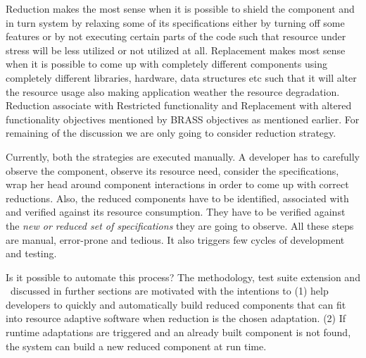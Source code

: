 Reduction makes the most sense when it is possible to shield the component and in turn system by relaxing some of its specifications either by turning off some features or by not executing certain parts of the code such that resource under stress will be less utilized or not utilized at all. Replacement makes most sense when it is possible to come up with completely different components using completely different libraries, hardware, data structures etc such that it will alter the resource usage also making application weather the resource degradation. Reduction associate with Restricted functionality and Replacement with altered functionality objectives mentioned by BRASS objectives as mentioned earlier. For remaining of the discussion we are only going to consider reduction strategy.   

Currently, both the strategies are executed manually. A developer has to carefully observe the component, observe its resource need, consider the specifications, wrap her head around component interactions in order to come up with correct reductions. Also, the reduced components have to be identified, associated with and verified against its resource consumption. They have to be verified against the \emph{new or reduced set of specifications} they are going to observe. All these steps are manual, error-prone and tedious. It also triggers few cycles of development and testing. 

Is it possible to automate this process? The methodology, test suite extension and \mytool\ discussed in further sections are motivated with the intentions to (1) help developers to quickly and automatically build reduced components that can fit into resource adaptive software when reduction is the chosen adaptation. (2) If runtime adaptations are triggered and an already built component is not found, the system can build a new reduced component at run time.  
